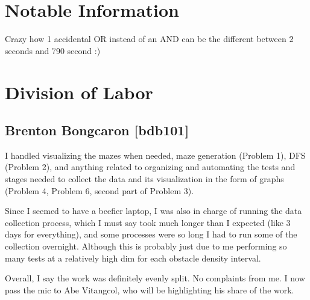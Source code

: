 \documentclass[11pt]{article}
\begin{document}
\section{Notable Information}
Crazy how 1 accidental OR instead of an AND can be the different between 2 seconds and 790 second :)
\pagebreak
\section{Division of Labor}
\subsection*{Brenton Bongcaron [bdb101]}
I handled visualizing the mazes when needed, maze generation (Problem 1), DFS (Problem 2), and anything related to organizing and automating the tests and stages needed to collect the data and its visualization in the form of graphs (Problem 4, Problem 6, second part of Problem 3). 

Since I seemed to have a beefier laptop, I was also in charge of running the data collection process, which I must say took much longer than I expected (like 3 days for everything), and some processes were so long I had to run some of the collection overnight. Although this is probably just due to me performing so many tests at a relatively high dim for each obstacle density interval.

Overall, I say the work was definitely evenly split. No complaints from me. I now pass the mic to Abe Vitangcol, who will be highlighting his share of the work.
\end{document}
